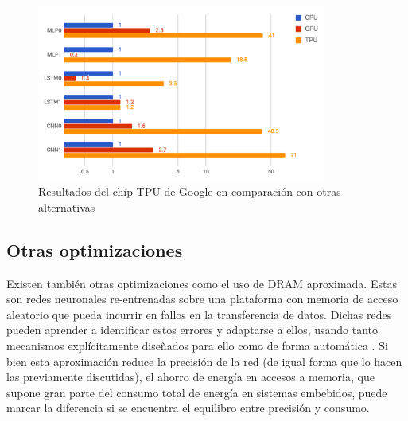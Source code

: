 \begin{figure}[h!]
    \centering
    \includegraphics[width=0.85\textwidth]{img/tpu_benchmarks.png}
    \caption{Resultados del chip TPU de Google en comparación con otras alternativas}
    \label{fig:tpu_benchmarks}
\end{figure}

\subsection{Otras optimizaciones}
\label{ssec:otras_optimizaciones}
Existen también otras optimizaciones como el uso de DRAM aproximada. Estas son redes neuronales re-entrenadas sobre una plataforma con memoria de acceso aleatorio que pueda incurrir en fallos en la transferencia de datos. Dichas redes pueden aprender a identificar estos errores y adaptarse a ellos, usando tanto mecanismos explícitamente diseñados para ello como de forma automática \cite{deep_learning_for_computer_architects} \cite{koppula2019eden}. Si bien esta aproximación reduce la precisión de la red (de igual forma que lo hacen las previamente discutidas), el ahorro de energía en accesos a memoria, que supone gran parte del consumo total de energía en sistemas embebidos, puede marcar la diferencia si se encuentra el equilibro entre precisión y consumo.